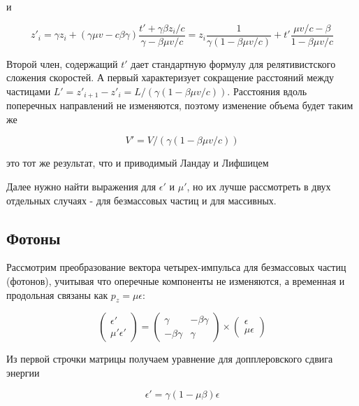 и

\begin{equation}
z'_i=\gamma z_i +(\gamma \mu v - c\beta \gamma)\frac{t'+\gamma\beta z_i/c}{\gamma - \beta \mu v/c}=z_i\frac{1}{\gamma(1-\beta\mu v/c)} + t'\frac{\mu v/c - \beta}{1 - \beta \mu v/c}
\end{equation}

Второй член, содержащий $t'$ дает стандартную формулу для релятивистского сложения скоростей. А первый характеризует сокращение расстояний между частицами $L' = z'_{i+1}-z'_i = L/(\gamma(1-\beta\mu v/c))$. Расстояния вдоль поперечных направлений не изменяются, поэтому изменение объема будет таким же

\begin{equation} \label{volume}
V' = V/(\gamma(1-\beta\mu v/c))
\end{equation}

это тот же результат, что и приводимый Ландау и Лифшицем \cite{LandauLifshitz2}

Далее нужно найти выражения для $\epsilon'$ и $\mu'$, но их лучше рассмотреть в двух отдельных случаях - для безмассовых частиц и для массивных.

\subsection{Фотоны}

Рассмотрим преобразование вектора четырех-импульса для безмассовых частиц (фотонов), учитывая что оперечные компоненты не изменяются, а временная и продольная связаны как $p_z = \mu \epsilon$:

\begin{equation}\label{lorentz_ph}
	\left(\begin{array}{c}
		\epsilon'\\
		\mu'\epsilon'
	\end{array}
	\right)
	= \left(
	\begin{array}{cc}
		\gamma & -\beta\gamma\\
		-\beta\gamma & \gamma
	\end{array}
	\right)
	\times
	\left(\begin{array}{c}
		\epsilon\\
		\mu\epsilon
	\end{array}
	\right)
\end{equation}

Из первой строчки матрицы получаем уравнение для допплеровского сдвига энергии

\begin{equation}\label{doppler_ph}
	\epsilon'=\gamma(1-\mu\beta)\epsilon
\end{equation}

